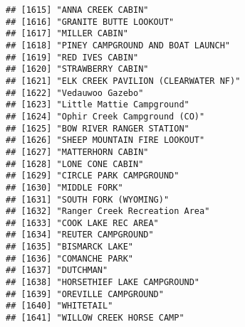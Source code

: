 \documentclass[
]{article}
\begin{document}
\begin{verbatim}
## [1615] "ANNA CREEK CABIN"                                                                    
## [1616] "GRANITE BUTTE LOOKOUT"                                                               
## [1617] "MILLER CABIN"                                                                        
## [1618] "PINEY CAMPGROUND AND BOAT LAUNCH"                                                    
## [1619] "RED IVES CABIN"                                                                      
## [1620] "STRAWBERRY CABIN"                                                                    
## [1621] "ELK CREEK PAVILION (CLEARWATER NF)"                                                  
## [1622] "Vedauwoo Gazebo"                                                                     
## [1623] "Little Mattie Campground"                                                            
## [1624] "Ophir Creek Campground (CO)"                                                         
## [1625] "BOW RIVER RANGER STATION"                                                            
## [1626] "SHEEP MOUNTAIN FIRE LOOKOUT"                                                         
## [1627] "MATTERHORN CABIN"                                                                    
## [1628] "LONE CONE CABIN"                                                                     
## [1629] "CIRCLE PARK CAMPGROUND"                                                              
## [1630] "MIDDLE FORK"                                                                         
## [1631] "SOUTH FORK (WYOMING)"                                                                
## [1632] "Ranger Creek Recreation Area"                                                        
## [1633] "COOK LAKE REC AREA"                                                                  
## [1634] "REUTER CAMPGROUND"                                                                   
## [1635] "BISMARCK LAKE"                                                                       
## [1636] "COMANCHE PARK"                                                                       
## [1637] "DUTCHMAN"                                                                            
## [1638] "HORSETHIEF LAKE CAMPGROUND"                                                          
## [1639] "OREVILLE CAMPGROUND"                                                                 
## [1640] "WHITETAIL"                                                                           
## [1641] "WILLOW CREEK HORSE CAMP"                                                             

\end{verbatim}
\end{document}
